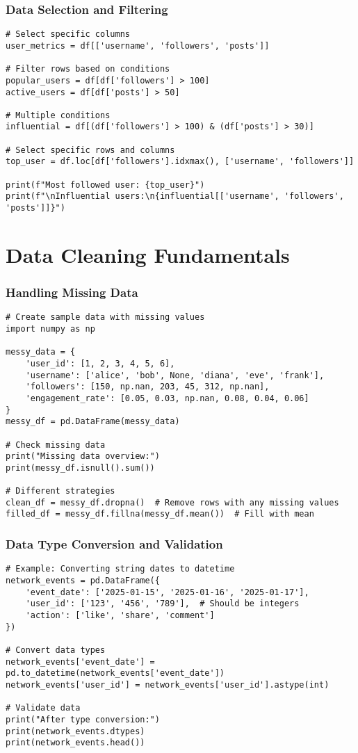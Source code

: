 \documentclass[aspectratio=169]{beamer}
\begin{document}
\begin{frame}[fragile]
\frametitle{Data Selection and Filtering}
\begin{lstlisting}[caption=Selecting and Filtering Data]
# Select specific columns
user_metrics = df[['username', 'followers', 'posts']]

# Filter rows based on conditions
popular_users = df[df['followers'] > 100]
active_users = df[df['posts'] > 50]

# Multiple conditions
influential = df[(df['followers'] > 100) & (df['posts'] > 30)]

# Select specific rows and columns
top_user = df.loc[df['followers'].idxmax(), ['username', 'followers']]

print(f"Most followed user: {top_user}")
print(f"\nInfluential users:\n{influential[['username', 'followers', 'posts']]}")
\end{lstlisting}
\end{frame}

\section{Data Cleaning Fundamentals}

\begin{frame}[fragile]
\frametitle{Handling Missing Data}
\begin{lstlisting}[caption=Common Missing Data Scenarios]
# Create sample data with missing values
import numpy as np

messy_data = {
    'user_id': [1, 2, 3, 4, 5, 6],
    'username': ['alice', 'bob', None, 'diana', 'eve', 'frank'],
    'followers': [150, np.nan, 203, 45, 312, np.nan],
    'engagement_rate': [0.05, 0.03, np.nan, 0.08, 0.04, 0.06]
}
messy_df = pd.DataFrame(messy_data)

# Check missing data
print("Missing data overview:")
print(messy_df.isnull().sum())

# Different strategies
clean_df = messy_df.dropna()  # Remove rows with any missing values
filled_df = messy_df.fillna(messy_df.mean())  # Fill with mean
\end{lstlisting}
\end{frame}

\begin{frame}[fragile]
\frametitle{Data Type Conversion and Validation}
\begin{lstlisting}[caption=Ensuring Correct Data Types]
# Example: Converting string dates to datetime
network_events = pd.DataFrame({
    'event_date': ['2025-01-15', '2025-01-16', '2025-01-17'],
    'user_id': ['123', '456', '789'],  # Should be integers
    'action': ['like', 'share', 'comment']
})

# Convert data types
network_events['event_date'] = pd.to_datetime(network_events['event_date'])
network_events['user_id'] = network_events['user_id'].astype(int)

# Validate data
print("After type conversion:")
print(network_events.dtypes)
print(network_events.head())
\end{lstlisting}
\end{frame}
\end{document}
